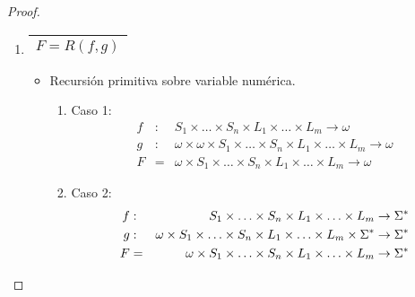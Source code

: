 \begin{proof}
    \begin{enumerate}
      \item \begin{tabular}{|c|} \hline $F = R(f, g)$ \\\hline \end{tabular}
        \begin{itemize}
          \item Recursión primitiva sobre variable numérica.
          \begin{enumerate}
            \item Caso 1:
            \begin{eqnarray}
              \nonumber f &:& S_{1} \times \dotsc \times S_{n} \times L_{1} \times \dotsc \times L_{m} \rightarrow
                \omega \\
              \nonumber g &:& \omega \times \omega \times S_{1} \times \dotsc \times S_{n} \times L_{1} \times \dotsc
                \times L_{m} \rightarrow \omega \\
              \nonumber F &=& \omega \times S_{1} \times \dotsc \times S_{n} \times L_{1} \times \dotsc \times L_{m}
                \rightarrow \omega
            \end{eqnarray}
            \item Caso 2:
            \begin{eqnarray}
              \nonumber f &:& S_{1} \times \dotsc \times S_{n} \times L_{1} \times \dotsc \times L_{m} \rightarrow
                \Sigma^{\ast} \\
              \nonumber g &:& \omega \times S_{1} \times \dotsc \times S_{n} \times L_{1} \times \dotsc \times L_{m}
                \times \Sigma^{\ast} \rightarrow \Sigma^{\ast} \\
              \nonumber F &=& \omega \times S_{1} \times \dotsc \times S_{n} \times L_{1} \times \dotsc \times L_{m}
                \rightarrow \Sigma^{\ast}
            \end{eqnarray}
          \end{enumerate}


\end{itemize}
\end{enumerate}
\end{proof}
